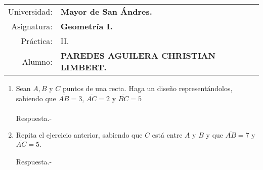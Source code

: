 \documentclass[10pt]{article}
\begin{document}
\begin{tabular}{r l }
Universidad: & \textbf{Mayor de San Ándres.}\\
Asignatura: & \textbf{Geometría I.}\\
 Práctica: & II.\\ 
Alumno: & \textbf{PAREDES AGUILERA CHRISTIAN LIMBERT.}
\end{tabular}
\begin{flushleft}
\end{flushleft}


    \begin{enumerate}

	\item Sean $A,B$ y $C$ puntos de una recta. Haga un diseño representándolos, sabiendo que $\overline{AB}=3$, $\overline{AC}=2$ y $\overline{BC}=5$\\\\
	Respuesta.-\;
    \begin{center}
    \end{center}

	\item Repita el ejercicio anterior, sabiendo que $C$ está entre $A$ y $B$ y que $\overline{AB}=7$ y $\overline{AC}=5.$\\\\
	Respuesta.-\;
    \begin{center}
    \end{center}


\end{enumerate}
\end{document}
